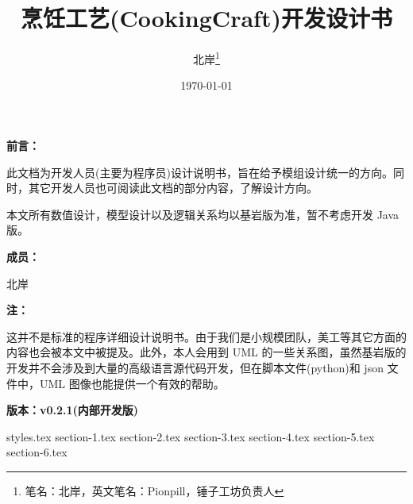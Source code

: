 \documentclass{PionpillNote-art}
\title{烹饪工艺(CookingCraft)开发设计书}
\author{
    北岸\footnote{笔名：北岸，英文笔名：Pionpill，锤子工坊负责人}
}
\date{\today}
\begin{document}
\maketitle                  %

\vspace{2cm}
\noindent\textbf{前言：}

此文档为开发人员(主要为程序员)设计说明书，旨在给予模组设计统一的方向。同时，其它开发人员也可阅读此文档的部分内容，了解设计方向。

本文所有数值设计，模型设计以及逻辑关系均以基岩版为准，暂不考虑开发 Java 版。

\noindent\textbf{成员：}

北岸

\noindent\textbf{注：}

这并不是标准的程序详细设计说明书。由于我们是小规模团队，美工等其它方面的内容也会被本文中被提及。此外，本人会用到 UML 的一些关系图，虽然基岩版的开发并不会涉及到大量的高级语言源代码开发，但在脚本文件(python)和 json 文件中，UML 图像也能提供一个有效的帮助。

\hfill \textbf{版本：v0.2.1(内部开发版)}


\newpage
\tableofcontents            %
\thispagestyle{empty}
\newpage
\setcounter{page}{1}

{styles.tex}
{section-1.tex}
{section-2.tex}
{section-3.tex}
{section-4.tex}
{section-5.tex}
{section-6.tex}

\end{document}
